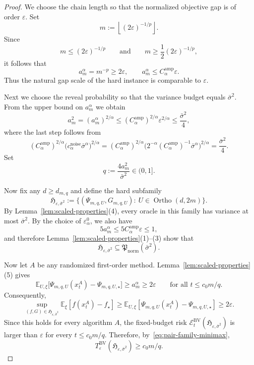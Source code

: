 \documentclass[11pt]{article}
\newcommand{\E}{\mathbb{E}}
\newcommand{\Ortho}{\operatorname{Ortho}}
\begin{document}
\begin{proof}
We choose the chain length so that the normalized objective gap is of order $\varepsilon$.
Set
\[
m:=\left\lfloor (2\varepsilon)^{-1/p}\right\rfloor.
\]
Since
\[
m\le (2\varepsilon)^{-1/p}
\qquad\text{and}\qquad
m\ge \frac12(2\varepsilon)^{-1/p},
\]
it follows that
\[
a_m^\alpha=m^{-p}\ge 2\varepsilon,
\qquad
a_m^\alpha\le C_\alpha^{\mathrm{amp}} \varepsilon.
\]
Thus the natural gap scale of the hard instance is comparable to $\varepsilon$.

Next we choose the reveal probability so that the variance budget equals $\bar \sigma^2$.
From the upper bound on $a_m^\alpha$ we obtain
\[
a_m^2
=
(a_m^\alpha)^{2/\alpha}
\le
(C_\alpha^{\mathrm{amp}})^{2/\alpha}\varepsilon^{2/\alpha}
\le
\frac{\bar \sigma^2}{4},
\]
where the last step follows from
\[
(C_\alpha^{\mathrm{amp}})^{2/\alpha}\bigl(c_\alpha^{\mathrm{noise}}\bar\sigma^\alpha\bigr)^{2/\alpha}
=
(C_\alpha^{\mathrm{amp}})^{2/\alpha}
\bigl(2^{-\alpha}(C_\alpha^{\mathrm{amp}})^{-1}\bar\sigma^\alpha\bigr)^{2/\alpha}
=
\frac{\bar\sigma^2}{4}.
\]
Set
\[
q:=\frac{4a_m^2}{\bar \sigma^2}\in (0,1].
\]

Now fix any $d\ge d_{m,q}$ and define the hard subfamily
\begin{equation}
\label{eq:normalized-hard-subfamily}
\mathfrak H_{\varepsilon,\bar \sigma^2}
:=
\{(\Psi_{m,q,U},G_{m,q,U}):\ U\in \Ortho(d,2m)\}.
\end{equation}
By Lemma~\ref{lem:scaled-properties}(4), every oracle in this family has variance at most $\bar \sigma^2$.
By the choice of \(\varepsilon_\alpha^0\), we also have
\[
5a_m^\alpha\le 5C_\alpha^{\mathrm{amp}} \varepsilon\le 1,
\]
and therefore Lemma~\ref{lem:scaled-properties}(1)--(3) show that
\[
\mathfrak H_{\varepsilon,\bar \sigma^2}\subseteq \mathfrak P_{\mathrm{norm}}(\bar \sigma^2).
\]

Now let $A$ be any randomized first-order method.
Lemma~\ref{lem:scaled-properties}(5) gives
\[
\E_{U,\xi}\bigl[\Psi_{m,q,U}(x_t^A)-\Psi_{m,q,U,\star}\bigr]\ge a_m^\alpha\ge 2\varepsilon
\qquad
\text{for all }t\le c_0 m/q.
\]
Consequently,
\[
\sup_{(f,G)\in \mathfrak H_{\varepsilon,\bar \sigma^2}}\E_\xi[f(x_t^A)-f_\star]
\ge
\E_{U,\xi}[\Psi_{m,q,U}(x_t^A)-\Psi_{m,q,U,\star}]
\ge
2\varepsilon.
\]
Since this holds for every algorithm \(A\), the fixed-budget risk
\(\mathcal E_t^{\mathrm{BV}}(\mathfrak H_{\varepsilon,\bar\sigma^2})\) is larger than \(\varepsilon\) for every
\(t\le c_0m/q\). Therefore, by~\eqref{eq:pair-family-minimax},
\[
T_\varepsilon^{\mathrm{BV}}(\mathfrak H_{\varepsilon,\bar \sigma^2})\ge c_0 m/q.
\]


\end{proof}
\end{document}
